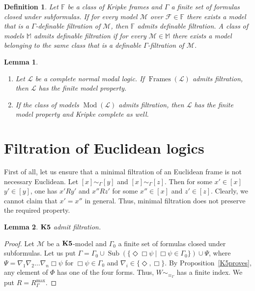 \documentclass[a4paper]{article}
\theoremstyle{defin}
\newtheorem{defin}{Definition}
\theoremstyle{theorem}
\theoremstyle{prop}
\theoremstyle{lemma}
\newtheorem{lemma}{Lemma}
\theoremstyle{ex}
\theoremstyle{col}
\begin{document}
\begin{defin} Let $\mathbb{F}$ be a class of Kripke frames and $\Gamma$ a finite set of formulas closed under subformulas. If for every model $\mathcal{M}$ over $\mathcal{F} \in \mathbb{F}$ there exists a model that is a $\Gamma$-definable filtration of $\mathcal{M}$, then $\mathbb{F}$ admits definable filtration. A class of models $\mathbb{M}$ admits definable filtration if for every $\mathcal{M} \in \mathbb{M}$ there exists a model belonging to the same class that is a definable $\Gamma$-filtration of $\mathcal{M}$.
\end{defin}

\begin{lemma}
  $ $

\begin{enumerate}
  \item Let $\mathcal{L}$ be a complete normal modal logic. If $\operatorname{Frames}(\mathcal{L})$ admits filtration, then $\mathcal{L}$ has the finite model property.
  \item If the class of models $\operatorname{Mod}(\mathcal{L})$ admits filtration, then $\mathcal{L}$ has the finite model property and Kripke complete as well.
\end{enumerate}
\end{lemma}

\section{Filtration of Euclidean logics}

First of all, let us ensure that a minimal filtration of an Euclidean frame is not necessary Euclidean.
Let $[x] \sim_{\Gamma} [y]$ and $[x] \sim_{\Gamma} [z]$. Then for some $x' \in [x]$ $y' \in [y]$, one has
$x' R y'$ and $x'' R z'$ for some $x'' \in [x]$ and $z' \in [z]$. Clearly, we cannot claim that $x' = x''$ in general. Thus, minimal filtration does not preserve the required property.

\begin{lemma}
  ${\bf K5}$ admit filtration.
\end{lemma}

\begin{proof}
  Let $\mathcal{M}$ be a ${\bf K5}$-model and $\Gamma_0$ a finite set of formulas closed under subformulas.
  Let us put $\Gamma = \Gamma_0 \cup \operatorname{Sub}(\{ \Diamond \Box \psi \: | \: \Box \psi \in \Gamma_0 \}) \cup \Psi$, where $\Psi = \nabla_1 \nabla_2 \dots \nabla_n \Box \psi$ for $\Box \psi \in \Gamma_0$ and
  $\nabla_i \in \{ \Diamond, \Box \}$. By Proposition~\ref{K5proves}, any element of $\Phi$ has one of the four forms. Thus, $W \sim_{\equiv_{\Gamma}}$ has a finite index.
  We put $\widehat{R} = R^{\operatorname{max}}_{\Gamma}$.
\end{proof}
\end{document}
